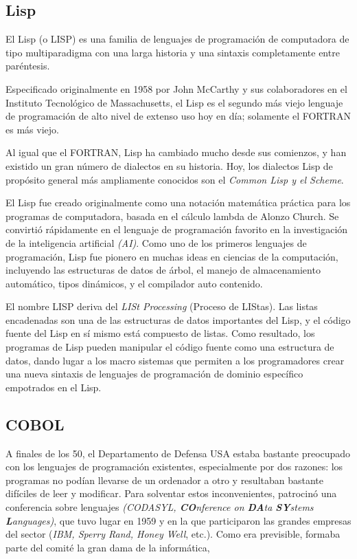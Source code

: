 \documentclass[twoside,twocolumn]{article}
\begin{document}
\subsection{Lisp}

El Lisp (o LISP) es una familia de lenguajes de programación de computadora de tipo multiparadigma con una larga historia y una sintaxis completamente entre paréntesis.

Especificado originalmente en 1958 por John McCarthy y sus colaboradores en el Instituto Tecnológico de Massachusetts\cite{mit}, el Lisp es el segundo más viejo lenguaje de programación de alto nivel de extenso uso hoy en día; solamente el FORTRAN es más viejo.

Al igual que el FORTRAN, Lisp ha cambiado mucho desde sus comienzos, y han existido un gran número de dialectos en su historia. Hoy, los dialectos Lisp de propósito general más ampliamente conocidos son el \textit{Common Lisp y el Scheme}.

El Lisp fue creado originalmente como una notación matemática práctica para los programas de computadora, basada en el cálculo lambda de Alonzo Church. Se convirtió rápidamente en el lenguaje de programación favorito en la investigación de la inteligencia artificial \textit{(AI)}. Como uno de los primeros lenguajes de programación, Lisp fue pionero en muchas ideas en ciencias de la computación, incluyendo las estructuras de datos de árbol, el manejo de almacenamiento automático, tipos dinámicos, y el compilador auto contenido.

El nombre LISP deriva del \textit{LISt Processing} (Proceso de LIStas). Las listas encadenadas son una de las estructuras de datos importantes del Lisp, y el código fuente del Lisp en sí mismo está compuesto de listas. Como resultado, los programas de Lisp pueden manipular el código fuente como una estructura de datos, dando lugar a los macro sistemas que permiten a los programadores crear una nueva sintaxis de lenguajes de programación de dominio específico empotrados en el Lisp.

\subsection{COBOL}

A finales de los 50, el Departamento de Defensa
USA estaba bastante preocupado con los lenguajes de
programación existentes, especialmente por dos razones: los programas no podían llevarse de un ordenador
a otro y resultaban bastante difíciles de leer y modificar.
Para solventar estos inconvenientes, patrocinó una
conferencia sobre lenguajes \textit{(CODASYL, \textbf{CO}nference
on \textbf{DA}ta \textbf{SY}stems \textbf{L}anguages)}, que tuvo lugar en 1959
y en la que participaron las grandes empresas del sector (\textit{IBM, Sperry Rand, Honey Well}, etc.). Como era
previsible, formaba parte del comité la gran dama de la
informática,
\end{document}
